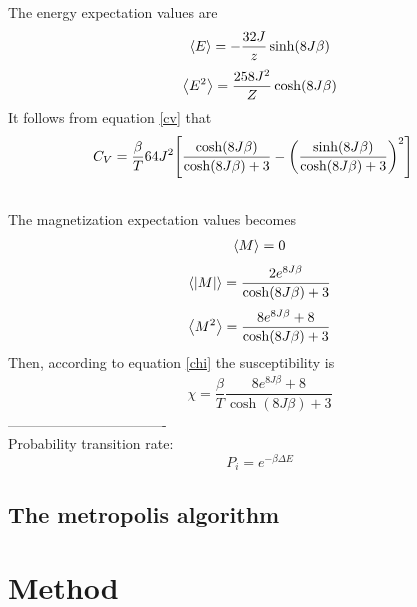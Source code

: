 \documentclass[%
reprint,nofootinbib,
amsmath,amssymb,
aps,
]{revtex4-1}
\begin{document}
The energy expectation values are \vspace{1mm}
\begin{align}\label{E}
	\expval{E} = -\dfrac{32J}{z}\sinh(8J\beta)
\end{align}\vspace{1mm}
\begin{align}\label{E2}
	\expval{E^2} = \dfrac{258J^2}{Z}\cosh(8J\beta)
\end{align}\vspace{1mm}
It follows from equation \ref{cv} that \vspace{1mm}
\begin{align} \label{CV}
	C_V= \dfrac{\beta}{T}64J^2\qty[\dfrac{\cosh(8J\beta)}{\cosh(8J\beta) + 3}  -\qty(\dfrac{\sinh(8J\beta)}{\cosh(8J\beta) + 3 })^2]\nonumber  \\&\nonumber \\
\end{align}\vspace{1mm}
The magnetization expectation values becomes \vspace{1mm}
\begin{align} \label{exM}
	\expval{M} =  0
\end{align}\vspace{1mm}
\begin{align} \label{absM}
\expval{\abs{M}} =  \dfrac{2e^{8J\beta}}{\cosh(8J\beta) + 3 }
\end{align}\vspace{1mm}
\begin{align}\label{M2}
\expval{M^2} = \dfrac{8e^{8J\beta} + 8}{\cosh(8J\beta) + 3}
\end{align}\vspace{1mm}
Then, according to equation \ref{chi} the susceptibility is \vspace{1mm}
\begin{align}\label{CHI}
	\chi = \dfrac{\beta}{T}\dfrac{8e^{8J\beta} + 8}{\cosh(8J\beta) + 3}
\end{align}
----------------------------------\\
Probability transition rate:
\begin{equation}
	P_i = e^{-\beta\Delta E}
\end{equation}

\subsection{The metropolis algorithm}
\newpage
\section{Method} \noindent 
\end{document}
